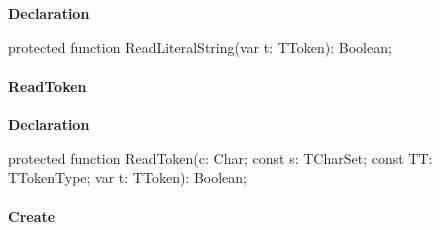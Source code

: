 \documentclass{report}
\newif\ifpdf
\begin{document}
\label{PasDoc_Tokenizer.TTokenizer-ReadLiteralString}
\begin{list}{}{
\setlength{\itemindent}{0cm}
\setlength{\listparindent}{0cm}
\setlength{\leftmargin}{\evensidemargin}
\addtolength{\leftmargin}{\tmplength}
\settowidth{\labelsep}{X}
\addtolength{\leftmargin}{\labelsep}
\setlength{\labelwidth}{\tmplength}
}
\item[\textbf{Declaration}\hfill]
\ifpdf
\begin{flushleft}
\fi
\begin{ttfamily}
protected function ReadLiteralString(var t: TToken): Boolean;\end{ttfamily}

\ifpdf
\end{flushleft}
\fi

\end{list}
\paragraph*{ReadToken}\hspace*{\fill}

\label{PasDoc_Tokenizer.TTokenizer-ReadToken}
\begin{list}{}{
\setlength{\itemindent}{0cm}
\setlength{\listparindent}{0cm}
\setlength{\leftmargin}{\evensidemargin}
\addtolength{\leftmargin}{\tmplength}
\settowidth{\labelsep}{X}
\addtolength{\leftmargin}{\labelsep}
\setlength{\labelwidth}{\tmplength}
}
\item[\textbf{Declaration}\hfill]
\ifpdf
\begin{flushleft}
\fi
\begin{ttfamily}
protected function ReadToken(c: Char; const s: TCharSet; const TT: TTokenType; var t: TToken): Boolean;\end{ttfamily}

\ifpdf
\end{flushleft}
\fi

\end{list}
\paragraph*{Create}\hspace*{\fill}
\end{document}

